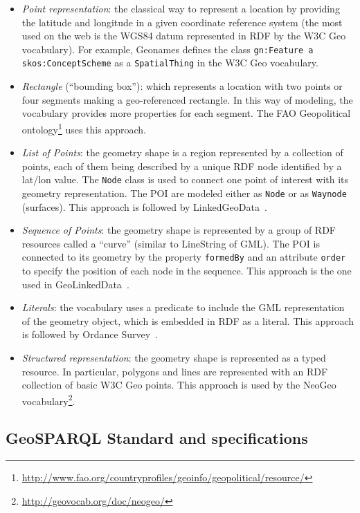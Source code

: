 \begin{itemize}
  \item \textit{Point representation}: the classical way to represent a location by providing the latitude and longitude in a given coordinate reference system (the most used on the web is the WGS84 datum represented in RDF by the W3C Geo vocabulary). For example, Geonames defines the class \texttt{gn:Feature a skos:ConceptScheme} as a \texttt{SpatialThing} in the W3C Geo vocabulary.
  \item \textit{Rectangle} (``bounding box''): which represents a location with two points or four segments making a geo-referenced rectangle. In this way of modeling, the vocabulary provides more properties for each segment. The FAO Geopolitical ontology\footnote{\url{http://www.fao.org/countryprofiles/geoinfo/geopolitical/resource/}} uses this approach.
  \item \textit{List of Points}: the geometry shape is a region represented by a collection of points, each of them being described by a unique RDF node identified by a lat/lon value. The \texttt{Node} class is used to connect one point of interest with its geometry representation. The POI are modeled either as \texttt{Node} or as \texttt{Waynode} (surfaces). This approach is followed by LinkedGeoData~\cite{linkedgeodata}.
  \item \textit{Sequence of Points}: the geometry shape is represented by a group of RDF resources called a ``curve'' (similar to LineString of GML). The POI is connected to its geometry by the property \texttt{formedBy} and an attribute \texttt{order} to specify the position of each node in the sequence. This approach is the one used in GeoLinkedData~\cite{deLeon2010}.
  \item \textit{Literals}: the vocabulary uses a predicate to include the GML representation of the geometry object, which is embedded in RDF as a literal. This approach is followed by Ordance Survey~\cite{Goodwin2008}.
  \item \textit{Structured representation}: the geometry shape is represented as a typed resource. In particular, polygons and lines are represented with an RDF collection of basic W3C Geo points. This approach is used by the NeoGeo vocabulary\footnote{\url{http://geovocab.org/doc/neogeo/}}.
\end{itemize}

\subsection{GeoSPARQL Standard and specifications}
\label{sec:specgeosparql}

